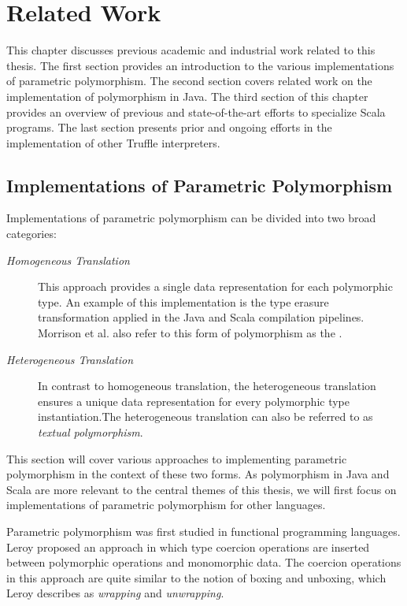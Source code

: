 
\chapter{Related Work}

This chapter discusses previous academic and industrial work related to this thesis. 
The first section provides an introduction to the various implementations of parametric polymorphism.
The second section covers related work on the implementation of polymorphism in Java.
The third section of this chapter provides an overview of previous and state-of-the-art efforts to specialize Scala programs.
The last section presents prior and ongoing efforts in the implementation of other Truffle interpreters.

\section{Implementations of Parametric Polymorphism}

Implementations of parametric polymorphism can be divided into two broad categories\cite{java:odersky-type-params}:

\begin{description}
	\item[\textit{Homogeneous Translation}] 
	This approach provides a single data representation for each polymorphic type. 
	An example of this implementation is the type erasure transformation applied in the Java and Scala compilation pipelines.
	Morrison et al. also refer to this form of polymorphism as the \cite{types-of-polymorphism}.
	\item[\textit{Heterogeneous Translation}]
	In contrast to homogeneous translation, the heterogeneous translation ensures a unique data representation for every polymorphic type instantiation.The heterogeneous translation can also be referred to as \textit{textual polymorphism}.
\end{description}

This section will cover various approaches to implementing parametric polymorphism in the context of these two forms.
As polymorphism in Java and Scala are more relevant to the central themes of this thesis, we will first focus on implementations of parametric polymorphism for other languages.

Parametric polymorphism was first studied in functional programming languages\cite{ml:parametric-polymorphism}\cite{ml:type-inference}.
Leroy proposed an approach in which type coercion operations are inserted between polymorphic operations and monomorphic data. 
The coercion operations in this approach are quite similar to the notion of boxing and unboxing, which Leroy describes as \textit{wrapping} and \textit{unwrapping}.

